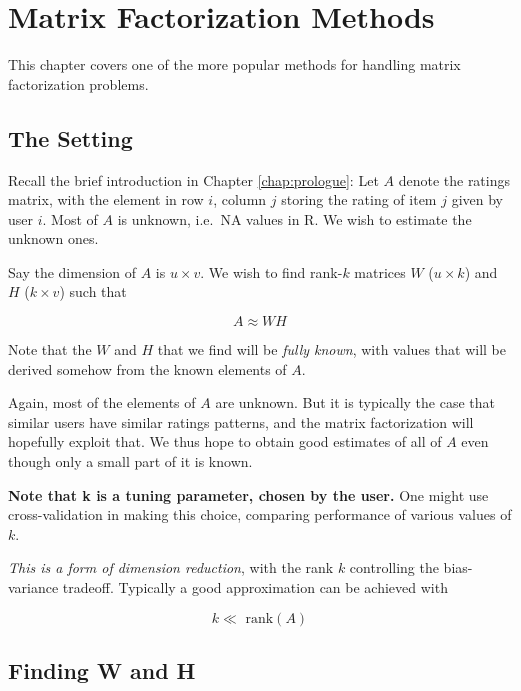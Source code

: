 \chapter{Matrix Factorization Methods}  
\label{chap:svd}

This chapter covers one of the more popular methods for handling matrix
factorization problems.

\section{The Setting}

Recall the brief introduction in Chapter \ref{chap:prologue}:  Let $A$
denote the ratings matrix, with the element in row $i$, column $j$
storing the rating of item $j$ given by user $i$.  Most of $A$ is
unknown, i.e.\ NA values in R.  We wish to estimate the unknown ones.

Say the dimension of $A$ is $u \times v$.  We wish to find rank-$k$
matrices $W$ ($u \times k$) and $H$ ($k \times v$) such that  

\begin{equation}
\label{awh}
A \approx W H
\end{equation}

Note that the $W$ and $H$ that we find will be \textit{fully known},
with values that will be derived somehow from the known elements of $A$.

Again, most of the elements of $A$ are unknown.  But it is typically the
case that similar users have similar ratings patterns, and the matrix
factorization will hopefully exploit that.  We thus hope to obtain good
estimates of all of $A$ even though only a small part of it is known.  

\textbf{Note that k is a tuning parameter, chosen by the user.}  One
might use cross-validation in making this choice, comparing performance
of various values of $k$.

\textit{This is a form of dimension reduction}, with the rank $k$
controlling the bias-variance tradeoff.  Typically a good approximation
can be achieved with

\begin{equation}
k \ll \textrm{ rank}(A)
\end{equation}

\section{Finding W and H}


